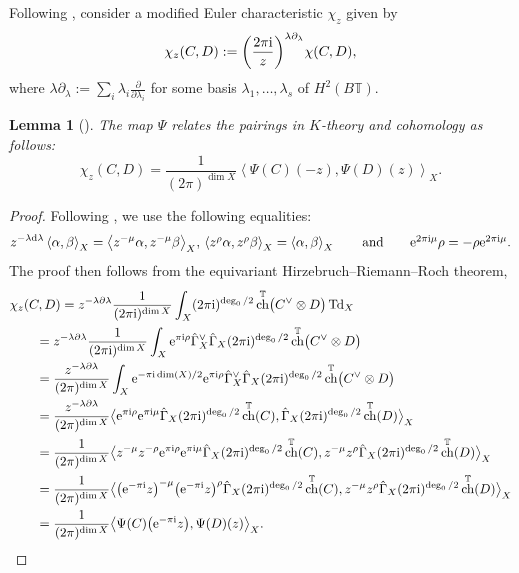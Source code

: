 \documentclass[pdftex]{sigma}
\newtheorem{Lemma}[Theorem]{Lemma}
\numberwithin{equation}{section}
\newcommand{\torus}{\mathbb{T}}
\DeclareMathOperator{\ch}{ch}
\newcommand{\br}[1]{\left\langle#1\right\rangle} %
\newcommand{\op}[1]{\operatorname{#1}}
\begin{document}
Following \cite{CIJ}, consider a modified Euler characteristic $\chi_z$ given by
\[
\chi_z(C, D) := \biggl(\frac{2 \pi {\rm i}}{ z}\biggr)^{\lambda \partial_\lambda} \chi(C, D),
\]
where $\lambda \partial_\lambda := \sum_i \lambda_i \frac{\partial}{\partial \lambda_i}$ for some basis $\lambda_1, \dots, \lambda_s$ of $H^2(B\torus)$.


\begin{Lemma}[{\cite[Proposition~2.10]{IriInt}}]
The map $\Psi$ relates the pairings in $K$-theory and cohomology as follows:
\[
\chi_z(C, D) = \frac{1}{ (2 \pi)^{\dim X}}\br{\Psi(C)(-z), \Psi(D)(z)}_X.
\]
\end{Lemma}
\begin{proof}
Following \cite[Proposition~3.2]{CIJ}, we use the following equalities:
\[
 z^{-\lambda {\rm d}\lambda} \br{\alpha,\beta}_X=\br{z^{-\mu}\alpha,z^{-\mu}\beta}_X$, $\br{z^{\rho}\alpha,z^\rho \beta}_X=\br{\alpha,\beta}_X
 \qquad \text{and}\qquad {\rm e}^{2\pi{\rm i}\mu}\rho=-\rho {\rm e}^{2\pi{\rm i}\mu}.
 \]
The proof then follows from the equivariant Hirzebruch--Riemann--Roch theorem,
\begin{align*}
&\chi_z(C, D)
 = z^{- \lambda \partial \lambda } \frac{1}{(2 \pi {\rm i})^{\dim X}} \int_X (2 \pi {\rm i})^{\op{deg}_0/2} \ch^\torus\bigl(C^\vee \otimes D\bigr) \op{Td}_X \\
&\qquad{} = z^{-\lambda \partial \lambda } \frac{1}{(2 \pi {\rm i})^{\dim X}} \int_X
 {\rm e}^{ \pi {\rm i} \rho} \hat \Gamma_X^\vee \hat \Gamma_X
(2 \pi {\rm i})^{\op{deg}_0/2} \ch^\torus\bigl(C^\vee \otimes D\bigr) \\
&\qquad{} = \frac{z^{-\lambda \partial \lambda }}{ (2 \pi)^{\dim X}} \int_X {\rm e}^{-\pi {\rm i} \dim(X)/2}
 {\rm e}^{\pi {\rm i} \rho} \hat \Gamma_X^\vee \hat \Gamma_X (2 \pi {\rm i})^{\op{deg}_0/2} \ch^\torus\bigl(C^\vee \otimes D\bigr)
 \\
&\qquad{}=
\frac{z^{-\lambda \partial \lambda }}{ (2 \pi)^{\dim X}}\bigl\langle {\rm e}^{\pi {\rm i} \rho} {\rm e}^{\pi {\rm i} \mu} \hat \Gamma_X (2 \pi {\rm i})^{\op{deg}_0/2}\ch^\torus(C), \hat \Gamma_X (2 \pi {\rm i})^{\op{deg}_0/2} \ch^\torus(D)\bigr\rangle_X \\
&\qquad{}=
\frac{1 }{ (2 \pi)^{\dim X}}\bigl\langle z^{- \mu} z^{- \rho} {\rm e}^{\pi {\rm i} \rho} {\rm e}^{\pi {\rm i} \mu} \hat \Gamma_X (2 \pi {\rm i})^{\op{deg}_0/2}\ch^\torus(C), z^{- \mu} z^{\rho} \hat \Gamma_X (2 \pi {\rm i})^{\op{deg}_0/2} \ch^\torus(D)\bigr\rangle_X \\
&\qquad{}=
\frac{1}{ (2 \pi)^{\dim X}}\bigl\langle\bigl( {\rm e}^{-\pi {\rm i}} z\bigr)^{- \mu} \bigl( {\rm e}^{-\pi {\rm i}}z\bigr)^\rho \hat \Gamma_X (2 \pi {\rm i})^{\op{deg}_0/2}\ch^\torus(C), z^{- \mu} z^{\rho} \hat \Gamma_X (2 \pi {\rm i})^{\op{deg}_0/2} \ch^\torus(D)\bigr\rangle_X \\
&\qquad{}= \frac{1}{ (2 \pi)^{\dim X}}\bigl\langle\Psi(C)\bigl( {\rm e}^{-\pi {\rm i}} z\bigr), \Psi(D)(z)\bigr\rangle_X.
\tag*{\qed}
\end{align*}
\renewcommand{\qed}{}
\end{proof}
\end{document}
